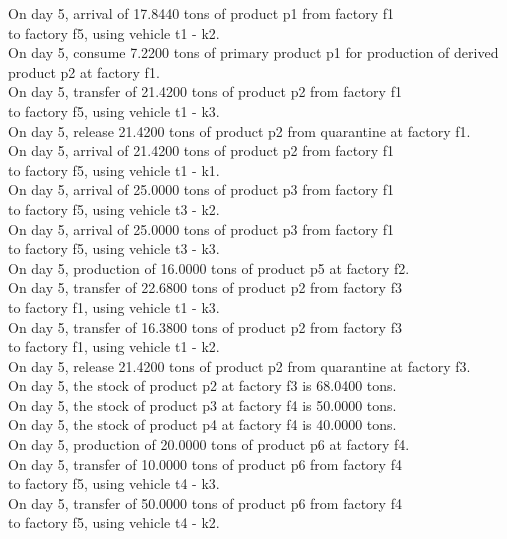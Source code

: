\begin{tabbing}
On day 5, arrival of 17.8440 tons of product p1 from factory f1 \\ to factory f5, using vehicle t1 - k2. \\
On day 5, consume 7.2200 tons of primary product p1 for production of derived product p2 at factory f1. \\
On day 5, transfer of 21.4200 tons of product p2 from factory f1 \\ to factory f5, using vehicle t1 - k3. \\
On day 5, release 21.4200 tons of product p2 from quarantine at factory f1. \\
On day 5, arrival of 21.4200 tons of product p2 from factory f1 \\ to factory f5, using vehicle t1 - k1. \\
On day 5, arrival of 25.0000 tons of product p3 from factory f1 \\ to factory f5, using vehicle t3 - k2. \\
On day 5, arrival of 25.0000 tons of product p3 from factory f1 \\ to factory f5, using vehicle t3 - k3. \\
On day 5, production of 16.0000 tons of product p5 at factory f2. \\
On day 5, transfer of 22.6800 tons of product p2 from factory f3 \\ to factory f1, using vehicle t1 - k3. \\
On day 5, transfer of 16.3800 tons of product p2 from factory f3 \\ to factory f1, using vehicle t1 - k2. \\
On day 5, release 21.4200 tons of product p2 from quarantine at factory f3. \\
On day 5, the stock of product p2 at factory f3 is 68.0400 tons. \\
On day 5, the stock of product p3 at factory f4 is 50.0000 tons. \\
On day 5, the stock of product p4 at factory f4 is 40.0000 tons. \\
On day 5, production of 20.0000 tons of product p6 at factory f4. \\
On day 5, transfer of 10.0000 tons of product p6 from factory f4 \\ to factory f5, using vehicle t4 - k3. \\
On day 5, transfer of 50.0000 tons of product p6 from factory f4 \\ to factory f5, using vehicle t4 - k2. \\

\end{tabbing}
